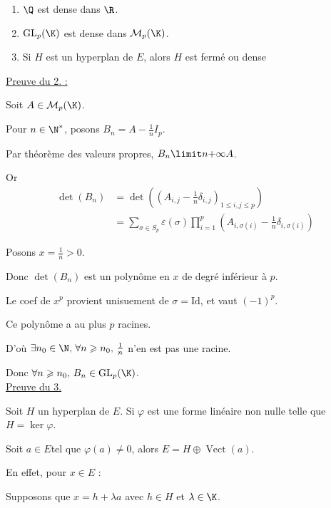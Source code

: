 \begin{exemple}
    \begin{enumerate}
        \item $\Q$ est dense dans $\R$.
        \item $\operatorname{GL}_p(\K)$ est dense dans $\mathcal M_p(\K)$.
        \item Si $H$ est un hyperplan de $E$, alors $H$ est fermé ou dense \\
    \end{enumerate}

    \uline{Preuve du 2. :}

    \svspace Soit $A \in \mathcal M_p(\K)$.

    Pour $n \in \N^*$, posons $B_n = A - \frac 1 n I_p$.

    Par théorème des valeurs propres, $B_n \limit n {+ \infty} A$.

    Or 
    \begin{align*}
        \det(B_n) & = \det((A_{i, j} - \frac 1 n \delta_{i, j})_{1 \leqslant i, j \leqslant p}) \\
        & = \sum_{ \sigma \in S_p} \varepsilon(\sigma) \prod_{i=1}^p (A_{i, \sigma(i)} - \frac 1 n \delta_{i, \sigma(i)}) 
    \end{align*}

    Posons $x = \frac 1 n > 0$. 

    Donc $\det(B_n) $ est un polynôme en $x$ de degré inférieur à $p$. 

    Le coef de $x^p$ provient unisuement de $\sigma = \text{Id}$, et vaut $(-1)^p$.

    Ce polynôme a au plus $p$ racines. 

    D'où $\exists n_0 \in \N, \, \forall n \geqslant n_0, \, \frac 1 n$ n'en est pas une racine. 

    Donc $\forall n \geqslant n_0, \, B_n \in \operatorname{GL}_p(\K)$. \\


    \uline{Preuve du 3. }

    \svspace Soit $H$ un hyperplan de $E$. Si $\varphi$ est une forme linéaire non nulle
    telle que $H = \ker \varphi$.

    Soit $a \in E $tel que $\varphi(a) \neq 0$, alors $E = H \oplus \operatorname{Vect}(a)$.

    En effet, pour $x \in E$ : 
    

    \svspace Supposons que $x = h + \lambda a$ avec $h \in H$ et $\lambda \in \K$.


\end{exemple}
